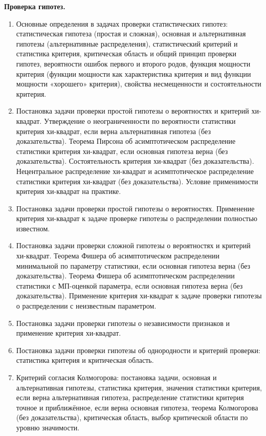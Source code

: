 \documentclass[a4paper,12pt]{article}
\newcommand{\theme}[1]{\hfil \textbf{#1} \hfil}
\begin{document}
\theme{Проверка гипотез.}
\begin{enumerate}[resume]
    \item \label{hyp:bas} Основные определения в задачах проверки статистических гипотез: статистическая гипотеза (простая и сложная), основная и альтернативная гипотезы (альтернативные распределения), статистический критерий и статистика критерия, критическая область и общий принцип проверки гипотез, вероятности ошибок первого и второго родов, функция мощности критерия (функции мощности как характеристика критерия и вид функции мощности «хорошего» критерия), свойства несмещенности и состоятельности критерия.
    \item \label{hyp:chi-pr} Постановка задачи проверки простой гипотезы о вероятностях и критерий хи-квадрат. Утверждение о неограниченности по вероятности статистики критерия хи-квадрат, если верна альтернативная гипотеза (без доказательства). Теорема Пирсона об асимптотическом распределение статистики критерия хи-квадрат, если основная гипотеза верна (без доказательства). Состоятельность критерия хи-квадрат (без доказательства). Нецентральное распределение хи-квадрат и асимптотическое распределение статистики критерия хи-квадрат (без доказательства). Условие применимости критерия хи-квадрат на практике.
    \item \label{hyp:chi-smp} Постановка задачи проверки простой гипотезы о вероятностях. Применение критерия хи-квадрат к задаче проверке гипотезы о распределении полностью известном.
    \item \label{hyp:chi-pr-par} Постановка задачи проверки сложной гипотезы о вероятностях и критерий хи-квадрат. Теорема Фишера об асимптотическом распределении минимальной по параметру статистики, если основная гипотеза верна (без доказательства). Теорема Фишера об асимптотическом распределении статистики с МП-оценкой параметра, если основная гипотеза верна (без доказательства). Применение критерия хи-квадрат к задаче проверки гипотезы о распределении с неизвестным параметром.
    \item \label{hyp:chi-ind} Постановка задачи проверки гипотезы о независимости признаков и применение критерия хи-квадрат.
    \item \label{hyp:con} Постановка задачи проверки гипотезы об однородности и критерий проверки: статистика критерия и критическая область.
    \item \label{hyp:K} Критерий согласия Колмогорова: постановка задачи, основная и альтернативная гипотезы, статистика критерия, значения статистики критерия, если верна альтернативная гипотеза, распределение статистики критерия точное и приближённое, если верна основная гипотеза, теорема Колмогорова (без доказательства), критическая область, выбор критической области по уровню значимости.

\end{enumerate}
\end{document}
